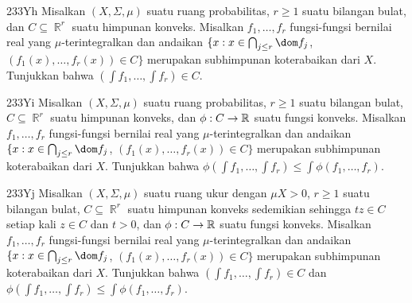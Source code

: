 {\spheader 233Yh Misalkan $(X,\Sigma,\mu)$ suatu ruang probabilitas,
$r\ge 1$ suatu bilangan bulat, dan $C\subseteq\BbbR^r$ suatu himpunan
konveks. Misalkan $f_1,\ldots,f_r$ fungsi-fungsi bernilai real yang
$\mu$-terintegralkan dan andaikan
$\{x:x\in\bigcap_{j\le r}\dom f_j$,
$(f_1(x),\ldots,f_r(x))\in C\}$ merupakan subhimpunan koterabaikan dari
$X$. Tunjukkan bahwa $(\int f_1,\ldots,\int f_r)\in C$.

\spheader 233Yi Misalkan $(X,\Sigma,\mu)$ suatu ruang probabilitas,
$r\ge 1$ suatu bilangan bulat, $C\subseteq\BbbR^r$ suatu himpunan
konveks, dan $\phi:C\to\Bbb R$ suatu fungsi konveks. Misalkan
$f_1,\ldots,f_r$ fungsi-fungsi bernilai real yang
$\mu$-terintegralkan dan andaikan
$\{x:x\in\bigcap_{j\le r}\dom f_j$,
$(f_1(x),\ldots,f_r(x))\in C\}$ merupakan subhimpunan koterabaikan dari
$X$. Tunjukkan bahwa
$\phi(\int f_1,\ldots,\int f_r)\le\int\phi(f_1,\ldots,f_r)$.

\spheader 233Yj Misalkan $(X,\Sigma,\mu)$ suatu ruang ukur dengan
$\mu X>0$, $r\ge 1$ suatu bilangan bulat, $C\subseteq\BbbR^r$ suatu
himpunan konveks sedemikian sehingga $tz\in C$ setiap kali $z\in C$ dan
$t>0$, dan $\phi:C\to\Bbb R$ suatu fungsi konveks. Misalkan
$f_1,\ldots,f_r$ fungsi-fungsi bernilai real yang
$\mu$-terintegralkan dan andaikan
$\{x:x\in\bigcap_{j\le r}\dom f_j$,
$(f_1(x),\ldots,f_r(x))\in C\}$ merupakan subhimpunan koterabaikan dari
$X$. Tunjukkan bahwa $(\int f_1,\ldots,\int f_r)\in C$ dan
$\phi(\int f_1,\ldots,\int f_r)\le\int\phi(f_1,\ldots,f_r)$.

}%

